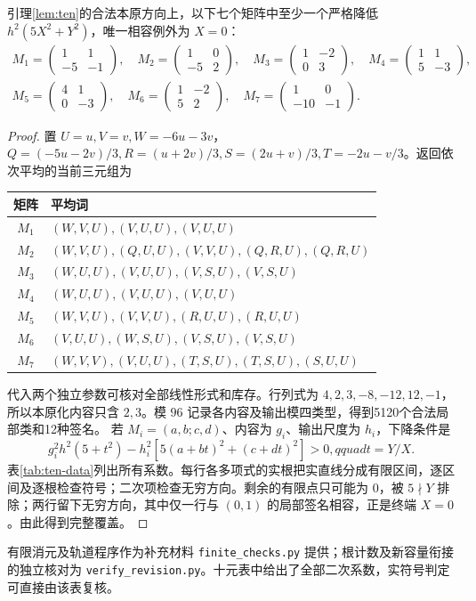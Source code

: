 \begin{proposition}[十元二次覆盖证书]\label{prop:ten-certificate}
引理\ref{lem:ten}的合法本原方向上，以下七个矩阵中至少一个严格降低 $h^2(5X^2+Y^2)$，唯一相容例外为 $X=0$：
\[
\begin{gathered}
M_1=\begin{pmatrix}1&1\\-5&-1\end{pmatrix},\quad
M_2=\begin{pmatrix}1&0\\-5&2\end{pmatrix},\quad
M_3=\begin{pmatrix}1&-2\\0&3\end{pmatrix},\quad
M_4=\begin{pmatrix}1&1\\5&-3\end{pmatrix},\\
M_5=\begin{pmatrix}4&1\\0&-3\end{pmatrix},\quad
M_6=\begin{pmatrix}1&-2\\5&2\end{pmatrix},\quad
M_7=\begin{pmatrix}1&0\\-10&-1\end{pmatrix}.
\end{gathered}
\]
\end{proposition}
\begin{proof}
置 $U=u,V=v,W=-6u-3v$，$Q=(-5u-2v)/3,R=(u+2v)/3,S=(2u+v)/3,T=-2u-v/3$。返回依次平均的当前三元组为
\begin{center}\small
\begin{tabular}{cl}\toprule
矩阵&平均词\\\midrule
$M_1$&$(W,V,U),(V,U,U),(V,U,U)$\\
$M_2$&$(W,V,U),(Q,U,U),(V,V,U),(Q,R,U),(Q,R,U)$\\
$M_3$&$(W,U,U),(V,U,U),(V,S,U),(V,S,U)$\\
$M_4$&$(W,U,U),(V,U,U),(V,U,U)$\\
$M_5$&$(W,V,U),(V,V,U),(R,U,U),(R,U,U)$\\
$M_6$&$(V,U,U),(W,S,U),(V,S,U),(V,S,U)$\\
$M_7$&$(W,V,V),(V,U,U),(T,S,U),(T,S,U),(S,U,U)$\\\bottomrule
\end{tabular}\end{center}
代入两个独立参数可核对全部线性形式和库存。行列式为 $4,2,3,-8,-12,12,-1$，所以本原化内容只含 $2,3$。模 $96$ 记录各内容及输出模四类型，得到5120个合法局部类和12种签名。
若 $M_i=(a,b;c,d)$、内容为 $g_i$、输出尺度为 $h_i$，下降条件是
\[
g_i^2h^2(5+t^2)-h_i^2[5(a+bt)^2+(c+dt)^2]>0,qquad t=Y/X.
\]
表\ref{tab:ten-data}列出所有系数。每行各多项式的实根把实直线分成有限区间，逐区间及逐根检查符号；二次项检查无穷方向。剩余的有限点只可能为 $0$，被 $5\nmid Y$ 排除；两行留下无穷方向，其中仅一行与 $(0,1)$ 的局部签名相容，正是终端 $X=0$。由此得到完整覆盖。
\end{proof}


有限消元及轨道程序作为补充材料 \texttt{finite\_checks.py} 提供；根计数及新容量衔接的独立核对为 \texttt{verify\_revision.py}。十元表中给出了全部二次系数，实符号判定可直接由该表复核。

